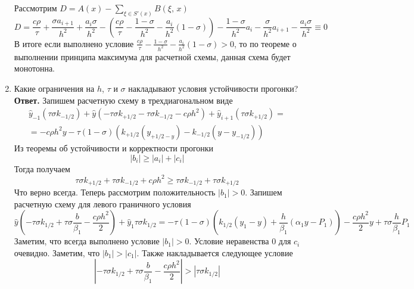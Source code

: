 \documentclass{article}
\begin{document}
\begin{enumerate}
\begin{equation*}
		\end{equation*}
		Рассмотрим $D = A(x) - \sum\limits_{\xi \in S'(x)} B(\xi, \, x)$
		\begin{equation*}
			D = \frac{c \rho }{\tau} + \frac{\sigma a_{i+1}}{h^2} + \frac{a_i \sigma}{h^2} - 
			(\frac{c \rho}{\tau}- \frac{1-\sigma}{h^2} - \frac{a_i}{h^2}(1-\sigma)) -
			\frac{1-\sigma}{h^2} a_i - \frac{\sigma}{h^2} a_{i+1} - \frac{a_i \sigma}{h^2} \equiv 0
		\end{equation*}
		В итоге если выполнено условие $\frac{c \rho}{\tau}- \frac{1-\sigma}{h^2} - \frac{a_i}{h^2}(1-\sigma) > 0$, то по
		теореме о выполнении принципа максимума для расчетной схемы, данная схема будет монотонна. 
		\item Какие ограничения на $h$, $\tau$ и $\sigma$ накладывают условия
		устойчивости прогонки?
		\newline
		{\bfseries Ответ. } 
		Запишем расчетную схему в трехдиагональном виде 
		\begin{gather*}
			\hat{y}_{-1} (\tau \sigma k_{-1/2}) + \hat{y} (-\tau \sigma k_{+1/2}
			 - \tau \sigma k_{-1/2} - c \rho h^2) + \hat{y}_{i+1} (\tau \sigma k_{+1/2})= \\=
			 -c \rho h^2 y - \tau (1-\sigma) (k_{+1/2}(y_{+1/2 - y}) - k_{-1/2} (y - y_{-1/2}))
		\end{gather*}
		Из теоремы об устойчивости и корректности прогонки 
		\begin{equation*}
			|b_i| \geqslant |a_i| + |c_i|
		\end{equation*}
		Тогда получаем
		\begin{equation*}
			\tau \sigma k_{+1/2}
			+ \tau \sigma k_{-1/2} + c \rho h^2 \geqslant \tau \sigma k_{-1/2} + \tau \sigma k_{+1/2}
		\end{equation*}
		Что верно всегда. 
		Теперь рассмотрим положительность $|b_1| > 0$. Запишем расчетную схему для левого граничного условия
		\begin{equation*}
			\hat{y} (- \tau \sigma k_{1/2} + \tau \sigma \frac{b}{\beta_1} - \frac{c \rho h^2}{2}) + 
			\hat{y}_1 \tau \sigma k_{1/2} = -\tau (1-\sigma) (k_{1/2}(y_1 - y) + \frac{h}{\beta_1} (\alpha_1 y - P_1)) 
			- \frac{c \rho h^2}{2} y + \tau \sigma \frac{h}{\beta_1} P_1
		\end{equation*}
		Заметим, что всегда выполнено условие $|b_1| > 0$. 
		Условие неравенства 0 для $c_i$ очевидно. Заметим, что $|b_1| > |c_1|$.
		Также накладывается следующее условие
		\begin{equation*}
			|- \tau \sigma k_{1/2} + \tau \sigma \frac{b}{\beta_1} - \frac{c \rho h^2}{2}| > |\tau \sigma k_{1/2}|

\end{equation*}
\end{enumerate}
\end{document}
